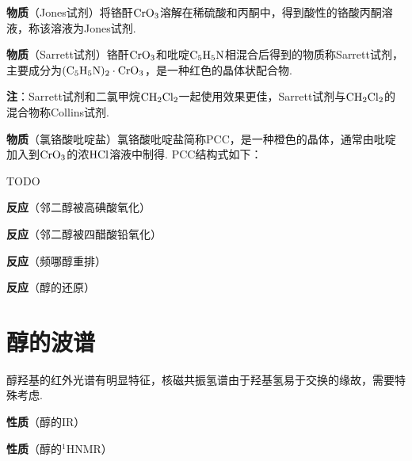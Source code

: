 \documentclass{article}
\begin{document}
\textbf{物质}（Jones试剂）将铬酐$\ce{CrO3}$溶解在稀硫酸和丙酮中，得到酸性的铬酸丙酮溶液，称该溶液为Jones试剂.

\textbf{物质}（Sarrett试剂）铬酐$\ce{CrO3}$和吡啶$\ce{C5H5N}$相混合后得到的物质称Sarrett试剂，主要成分为$\ce{(C5H5N)2\cdot CrO3}$，是一种红色的晶体状配合物.

\textbf{注}：Sarrett试剂和二氯甲烷$\ce{CH2Cl2}$一起使用效果更佳，Sarrett试剂与$\ce{CH2Cl2}$的混合物称Collins试剂.

\textbf{物质}（氯铬酸吡啶盐）氯铬酸吡啶盐简称PCC，是一种橙色的晶体，通常由吡啶加入到$\ce{CrO3}$的浓$\ce{HCl}$溶液中制得. PCC结构式如下：

TODO

\textbf{反应}（邻二醇被高碘酸氧化）

\textbf{反应}（邻二醇被四醋酸铅氧化）

\textbf{反应}（频哪醇重排）

\textbf{反应}（醇的还原）

\section*{醇的波谱}

醇羟基的红外光谱有明显特征，核磁共振氢谱由于羟基氢易于交换的缘故，需要特殊考虑.

\textbf{性质}（醇的IR）

\textbf{性质}（醇的$^1$HNMR）
\end{document}
